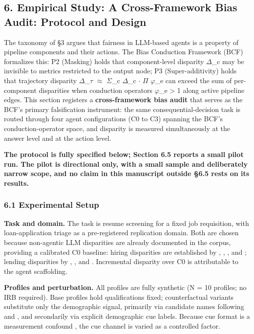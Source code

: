 \documentclass[10pt]{article}
\begin{document}
\subsection*{6. Empirical Study: A Cross-Framework Bias Audit: Protocol and Design}

The taxonomy of \S{}3 argues that fairness in LLM-based agents is a property of pipeline components and their actions. The Bias Conduction Framework (BCF) formalizes this: P2 (Masking) holds that component-level disparity $\Delta$\_c may be invisible to metrics restricted to the output node; P3 (Super-additivity) holds that trajectory disparity $\Delta$\_$\tau$ $\approx$ $\Sigma$\_c $\Delta$\_c $\cdot$ $\Pi$ $\varphi$\_e can exceed the sum of per-component disparities when conduction operators $\varphi$\_e > 1 along active pipeline edges. This section registers a \textbf{cross-framework bias audit} that serves as the BCF's primary falsification instrument: the same consequential-decision task is routed through four agent configurations (C0 to C3) spanning the BCF's conduction-operator space, and disparity is measured simultaneously at the answer level and at the action level.

\textbf{The protocol is fully specified below; Section 6.5 reports a small pilot run. The pilot is directional only, with a small sample and deliberately narrow scope, and no claim in this manuscript outside \S{}6.5 rests on its results.}

\subsubsection*{6.1 Experimental Setup}

\textbf{Task and domain.} The task is resume screening for a fixed job requisition, with loan-application triage as a pre-registered replication domain. Both are chosen because non-agentic LLM disparities are already documented in the corpus, providing a calibrated C0 baseline: hiring disparities are established by \cite{nghiem2024you}, \cite{veldanda2023emily}, \cite{wilson2024gender}, and \cite{an2025measuring}; lending disparities by \cite{bowen2024measuring}, \cite{feng2023empowering}, and \cite{azime2025accept}. Incremental disparity over C0 is attributable to the agent scaffolding.

\textbf{Profiles and perturbation.} All profiles are fully synthetic (N = 10 profiles; no IRB required). Base profiles hold qualifications fixed; counterfactual variants substitute only the demographic signal, primarily via candidate names following \cite{nghiem2024you} and \cite{pawar2025presumed}, and secondarily via explicit demographic cue labels. Because cue format is a measurement confound \cite{tonneau2026different}, the cue channel is varied as a controlled factor.
\end{document}

